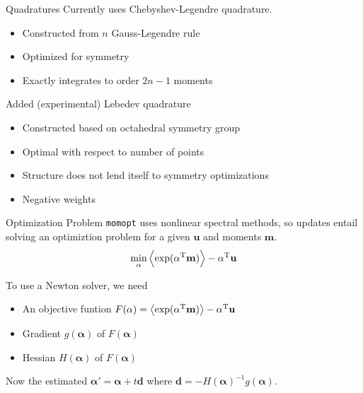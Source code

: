 \documentclass{beamer}
\renewcommand{\vec}[1]{\ensuremath{\mathbf{#1}}}
\newcommand{\integral}[1]{\ensuremath{\left\langle #1 \right\rangle}}
\newcommand{\T}[1]{\ensuremath{#1^\textnormal{T}}}
\newcommand{\momopt}{\texttt{momopt}\xspace}
\begin{document}
    \begin{frame}{Quadratures}
        Currently uses Chebyshev-Legendre quadrature.
        \begin{itemize}
            \item Constructed from $n$ Gauss-Legendre rule
            \item Optimized for symmetry
            \item Exactly integrates to order $2n - 1$ moments
        \end{itemize}

        \vfill

        Added (experimental) Lebedev quadrature
        \begin{itemize}
            \item Constructed based on octahedral symmetry group
            \item Optimal with respect to number of points
            \item Structure does not lend itself to symmetry optimizations
            \item Negative weights
        \end{itemize}
    \end{frame}

    \begin{frame}{Optimization Problem}
        \momopt uses nonlinear spectral methods, so updates entail solving an optimiztion problem for a given \vec{u} and moments \vec{m}.
        \begin{equation*}
            \min_{\vec{\alpha}} \integral{\exp(\T{\vec{\alpha}} \vec{m})} - \T{\vec{\alpha}} \vec{u}
        \end{equation*}

        \vfill

        To use a Newton solver, we need
        \begin{itemize}
            \item An objective funtion $F(\vec{\alpha}) = \integral{\exp(\T{\vec{\alpha}} \vec{m})} - \T{\vec{\alpha}} \vec{u}$
            \item Gradient $g(\vec{\alpha})$ of $F(\vec{\alpha})$
            \item Hessian $H(\vec{\alpha})$ of $F(\vec{\alpha})$
        \end{itemize}

        \vfill

        Now the estimated $\vec{\alpha}' = \vec{\alpha} + t\vec{d}$ where $\vec{d} = -H(\vec{\alpha})^{-1}g(\vec{\alpha})$.
    \end{frame}
\end{document}
